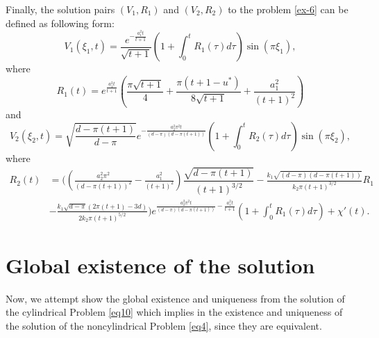 \documentclass[preprint,12pt,authoryear]{elsarticle}
\begin{document}
Finally, the solution pairs $(V_1,R_1)$ and $(V_2,R_2)$ to the problem \eqref{ex-6} can be defined as following form:
\begin{equation}\label{ex-7}
    V_1(\xi_1,t)=\dfrac{e^{-\frac{a_1^2t}{t+1}}}{\sqrt{t+1}}\left(1+\int_0^tR_1(\tau)d\tau\right)\sin(\pi\xi_1),
\end{equation}
where
\begin{equation}\label{ex-8}
    R_1(t)=e^{\frac{a_1^2t}{t+1}}\left(\frac{\pi\sqrt{t+1}}{4}+\frac{\pi(t+1-u^*)}{8\sqrt{t+1}}+\frac{a_1^2}{(t+1)^2}\right)
\end{equation}
and 
\begin{equation}\label{ex-9}
    V_2(\xi_2,t)=\sqrt{\frac{d-\pi(t+1)}{d-\pi}}e^{-\frac{a_2^2\pi^2t}{(d-\pi)(d-\pi(t+1))}}\left(1+\int_0^tR_2(\tau)d\tau\right)\sin\left(\pi\xi_2\right),
\end{equation}
where
\begin{equation}\label{ex-10}
    \begin{split}
        R_2(t)&=\Bigg(\left(\frac{a_2^2\pi^2}{(d-\pi(t+1))^2}-\frac{a_1^2}{(t+1)^2}\right)\dfrac{\sqrt{d-\pi(t+1)}}{(t+1)^{3/2}}-\frac{k_1\sqrt{(d-\pi)(d-\pi(t+1))}}{k_2\pi(t+1)^{3/2}}R_1\\
        &-\frac{k_1\sqrt{d-\pi}(2\pi(t+1)-3d)}{2k_2\pi(t+1)^{5/2}}\Bigg)e^{\frac{a_2^2\pi^2t}{(d-\pi)(d-\pi(t+1))}-\frac{a_1^2t}{t+1}}\left(1+\int_0^tR_1(\tau)d\tau\right)+\chi'(t).
    \end{split}
\end{equation}


\section{Global existence of the solution}
Now, we attempt show the global existence and uniqueness from the solution of the cylindrical Problem \eqref{eq10} which implies in the existence and uniqueness of the solution of the noncylindrical Problem \eqref{eq4}, since they are equivalent.
\end{document}
